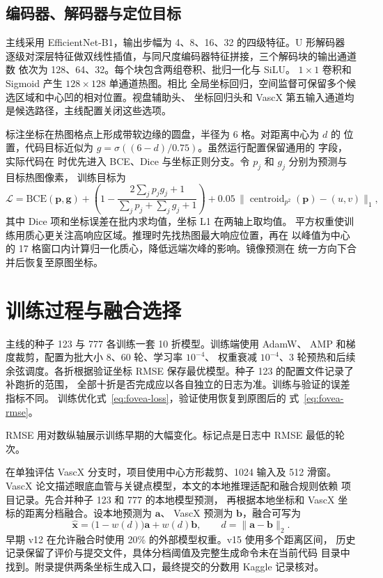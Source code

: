 
\subsection{编码器、解码器与定位目标}
主线采用 EfficientNet-B1，输出步幅为 4、8、16、32 的四级特征。U 形解码器
逐级对深层特征做双线性插值，与同尺度编码器特征拼接，三个解码块的输出通道数
依次为 128、64、32。每个块包含两组卷积、批归一化与 SiLU。
$1\times1$ 卷积和 Sigmoid 产生 $128\times128$ 单通道热图。相比
全局坐标回归，空间监督可保留多个候选区域和中心凹的相对位置。视盘辅助头、
坐标回归头和 VascX 第五输入通道均是候选路径，主线配置关闭这些选项。

标注坐标在热图格点上形成带软边缘的圆盘，半径为 6 格。对距离中心为 $d$ 的
位置，代码目标近似为 $g=\sigma((6-d)/0.75)$。虽然运行配置保留通用的
 字段，实际代码在  时优先进入
BCE、Dice 与坐标正则分支。令 $p_j$ 和 $g_j$ 分别为预测与目标热图像素，
训练目标为
\begin{equation}
 \mathcal L =
  \mathrm{BCE}(\mathbf p,\mathbf g)+
  \left(1-\frac{2\sum_j p_jg_j+1}{\sum_j p_j+\sum_j g_j+1}\right)
  +0.05\,\big\|\operatorname{centroid}_{p^2}(\mathbf p)-(u,v)\big\|_1 ,
 \label{eq:fovea-loss}
\end{equation}
其中 Dice 项和坐标误差在批内求均值，坐标 L1 在两轴上取均值。
平方权重使训练用质心更关注高响应区域。推理时先找热图最大响应位置，再在
以峰值为中心的 17 格窗口内计算归一化质心，降低远端次峰的影响。镜像预测在
统一方向下合并后恢复至原图坐标。

\section{训练过程与融合选择}
主线的种子 123 与 777 各训练一套 10 折模型。训练端使用 AdamW、
AMP 和梯度裁剪，配置为批大小 8、60 轮、学习率 $10^{-4}$、
权重衰减 $10^{-4}$、3 轮预热和后续余弦调度。各折根据验证坐标
RMSE 保存最优模型。种子 123 的配置文件记录了补跑折的范围，
全部十折是否完成应以各自独立的日志为准。训练与验证的误差指标不同。
训练优化式~\eqref{eq:fovea-loss}，验证使用恢复到原图后的
式~\eqref{eq:fovea-rmse}。

{RMSE 用对数纵轴展示训练早期的大幅变化。标记点是日志中 RMSE 最低的轮次。}

在单独评估 VascX 分支时，项目使用中心方形裁剪、1024 输入及 512 滑窗。
VascX 论文描述眼底血管与关键点模型，本文的本地推理适配和融合规则依赖
项目记录\citep{vargas2025vascx}。先合并种子 123 和 777 的本地模型预测，
再根据本地坐标和 VascX 坐标的距离分档融合。设本地预测为 $\mathbf a$、
VascX 预测为 $\mathbf b$，融合可写为
\[
 \hat{\mathbf x}=\bigl(1-w(d)\bigr)\mathbf a+w(d)\mathbf b,\qquad
 d=\|\mathbf a-\mathbf b\|_2 .
\]
早期 v12 在允许融合时使用 20\% 的外部模型权重。v15 使用多个距离区间，
历史记录保留了评价与提交文件，具体分档阈值及完整生成命令未在当前代码
目录中找到。附录提供两条坐标生成入口，最终提交的分数用 Kaggle 记录核对。

